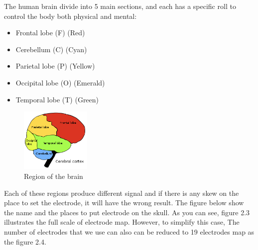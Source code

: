    
    
    The human brain divide into 5 main sections, and each has a specific roll to control the body both physical and mental:
    
    \begin{itemize}
        \item Frontal lobe (F) (Red)
        \item Cerebellum (C) (Cyan)
        \item Parietal lobe (P) (Yellow)
        \item Occipital lobe (O) (Emerald)
        \item Temporal lobe (T) (Green)
    \end{itemize}
    
    \begin{figure}[h]
        \centering
        \includegraphics[width = 0.3\textwidth]{images/Brain.png}  
        \caption{Region of the brain}
        \label{fig:region_of_the_brain}
    \end{figure}
    
    Each of these regions produce different signal and if there is any skew on the place to set the electrode, it will have the wrong result. The figure below show the name and the places to put electrode on the skull. As you can see, figure 2.3 illustrates the full scale of electrode map. However, to simplify this case, The number of electrodes that we use can also can be reduced to 19 electrodes map as the figure 2.4.

